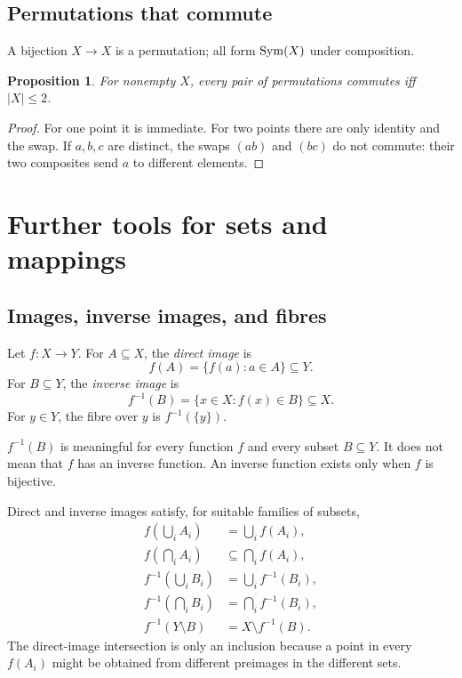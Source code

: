 \documentclass[11pt,openany]{book}
\newtheorem{proposition}[theorem]{Proposition}
\theoremstyle{definition}
\begin{document}
\section{Permutations that commute}
A bijection $X\to X$ is a permutation; all form $\operatorname{Sym}(X)$ under composition.
\begin{proposition}For nonempty $X$, every pair of permutations commutes iff $|X|\le2$.\end{proposition}
\begin{proof}For one point it is immediate. For two points there are only identity and the swap. If $a,b,c$ are distinct, the swaps $(ab)$ and $(bc)$ do not commute: their two composites send $a$ to different elements.\end{proof}


\chapter{Further tools for sets and mappings}

\section{Images, inverse images, and fibres}
Let $f:X\to Y$. For $A\subseteq X$, the \emph{direct image} is
\[
f(A)=\{f(a):a\in A\}\subseteq Y.
\]
For $B\subseteq Y$, the \emph{inverse image} is
\[
f^{-1}(B)=\{x\in X:f(x)\in B\}\subseteq X.
\]
For $y\in Y$, the fibre over $y$ is $f^{-1}(\{y\})$.

\begin{warningbox}
$f^{-1}(B)$ is meaningful for every function $f$ and every subset $B\subseteq Y$. It does not mean that $f$ has an inverse function. An inverse function exists only when $f$ is bijective.
\end{warningbox}

Direct and inverse images satisfy, for suitable families of subsets,
\begin{align*}
f\left(\bigcup_i A_i\right)&=\bigcup_i f(A_i),\\
f\left(\bigcap_i A_i\right)&\subseteq\bigcap_i f(A_i),\\
f^{-1}\left(\bigcup_i B_i\right)&=\bigcup_i f^{-1}(B_i),\\
f^{-1}\left(\bigcap_i B_i\right)&=\bigcap_i f^{-1}(B_i),\\
f^{-1}(Y\setminus B)&=X\setminus f^{-1}(B).
\end{align*}
The direct-image intersection is only an inclusion because a point in every $f(A_i)$ might be obtained from different preimages in the different sets.
\end{document}
